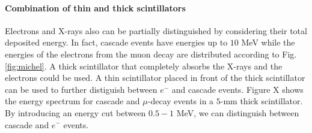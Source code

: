 \documentclass[12pt]{article}
\begin{document}
\paragraph{Combination of thin and thick scintillators}
Electrons and X-rays also can be partially distinguished by considering their total deposited energy. In fact, cascade events have energies up to $10$ MeV while the energies of the electrons from the muon decay are distributed according to Fig. \ref{fig:michel}. A thick scintillator that completely absorbs the X-rays and the electrons could be used. A thin scintillator placed in front of the thick scintillator can be used to further distiguish between $e^-$ and cascade events. Figure X shows the energy spectrum for cascade and $\mu$-decay events in a $5$-mm thick scintillator. By introducing an energy cut between $0.5 - 1$ MeV, we can distinguish between cascade and $e^-$ events. 
\end{document}
